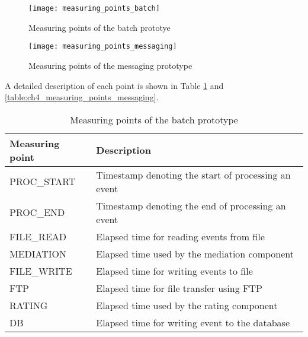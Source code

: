 \begin{figure}[htpb]
	\centering
	\texttt{[image: measuring\_points\_batch]}
	\caption{Measuring points of the batch prototye}
	\label{fig:ch4_measuring_points_batch}
\end{figure}

\begin{figure}[htpb]
	\centering
	\texttt{[image: measuring\_points\_messaging]}
	\caption{Measuring points of the messaging prototype}
	\label{fig:ch4_measuring_points_messaging}
\end{figure}

A detailed description of each point is shown in Table \ref{table:ch4_measuring_points_batch} and \ref{table:ch4_measuring_points_messaging}.

\begin{table}
	\caption{Measuring points of the batch prototype}
	\label{table:ch4_measuring_points_batch}
	\centering
	\begin{tabular}{|l|p{5cm}|}
		\hline
		\bfseries Measuring point & \bfseries Description\\
		\hline
		PROC\_START & Timestamp denoting the start of processing an event\\
		\hline
		PROC\_END & Timestamp denoting the end of processing an event\\
		\hline
		FILE\_READ & Elapsed time for reading events from file\\
		\hline
		MEDIATION & Elapsed time used by the mediation component\\
		\hline
		FILE\_WRITE & Elapsed time for writing events to file\\
		\hline
		FTP & Elapsed time for file transfer using FTP\\
		\hline
		RATING & Elapsed time used by the rating component\\
		\hline
		DB & Elapsed time for writing event to the database\\
		\hline 
	\end{tabular}
\end{table}

